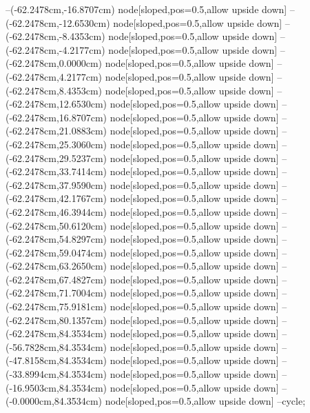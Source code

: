 --(-62.2478cm,-16.8707cm) node[sloped,pos=0.5,allow upside down]{\ArrowIn}
--(-62.2478cm,-12.6530cm) node[sloped,pos=0.5,allow upside down]{\ArrowIn}
--(-62.2478cm,-8.4353cm) node[sloped,pos=0.5,allow upside down]{\ArrowIn}
--(-62.2478cm,-4.2177cm) node[sloped,pos=0.5,allow upside down]{\ArrowIn}
--(-62.2478cm,0.0000cm) node[sloped,pos=0.5,allow upside down]{\ArrowIn}
--(-62.2478cm,4.2177cm) node[sloped,pos=0.5,allow upside down]{\ArrowIn}
--(-62.2478cm,8.4353cm) node[sloped,pos=0.5,allow upside down]{\ArrowIn}
--(-62.2478cm,12.6530cm) node[sloped,pos=0.5,allow upside down]{\ArrowIn}
--(-62.2478cm,16.8707cm) node[sloped,pos=0.5,allow upside down]{\ArrowIn}
--(-62.2478cm,21.0883cm) node[sloped,pos=0.5,allow upside down]{\ArrowIn}
--(-62.2478cm,25.3060cm) node[sloped,pos=0.5,allow upside down]{\ArrowIn}
--(-62.2478cm,29.5237cm) node[sloped,pos=0.5,allow upside down]{\ArrowIn}
--(-62.2478cm,33.7414cm) node[sloped,pos=0.5,allow upside down]{\ArrowIn}
--(-62.2478cm,37.9590cm) node[sloped,pos=0.5,allow upside down]{\ArrowIn}
--(-62.2478cm,42.1767cm) node[sloped,pos=0.5,allow upside down]{\ArrowIn}
--(-62.2478cm,46.3944cm) node[sloped,pos=0.5,allow upside down]{\ArrowIn}
--(-62.2478cm,50.6120cm) node[sloped,pos=0.5,allow upside down]{\ArrowIn}
--(-62.2478cm,54.8297cm) node[sloped,pos=0.5,allow upside down]{\ArrowIn}
--(-62.2478cm,59.0474cm) node[sloped,pos=0.5,allow upside down]{\ArrowIn}
--(-62.2478cm,63.2650cm) node[sloped,pos=0.5,allow upside down]{\ArrowIn}
--(-62.2478cm,67.4827cm) node[sloped,pos=0.5,allow upside down]{\ArrowIn}
--(-62.2478cm,71.7004cm) node[sloped,pos=0.5,allow upside down]{\ArrowIn}
--(-62.2478cm,75.9181cm) node[sloped,pos=0.5,allow upside down]{\ArrowIn}
--(-62.2478cm,80.1357cm) node[sloped,pos=0.5,allow upside down]{\ArrowIn}
--(-62.2478cm,84.3534cm) node[sloped,pos=0.5,allow upside down]{\ArrowIn}
--(-56.7828cm,84.3534cm) node[sloped,pos=0.5,allow upside down]{\ArrowIn}
--(-47.8158cm,84.3534cm) node[sloped,pos=0.5,allow upside down]{\ArrowIn}
--(-33.8994cm,84.3534cm) node[sloped,pos=0.5,allow upside down]{\ArrowIn}
--(-16.9503cm,84.3534cm) node[sloped,pos=0.5,allow upside down]{\ArrowIn}
--(-0.0000cm,84.3534cm) node[sloped,pos=0.5,allow upside down]{\ArrowIn}
--cycle;
